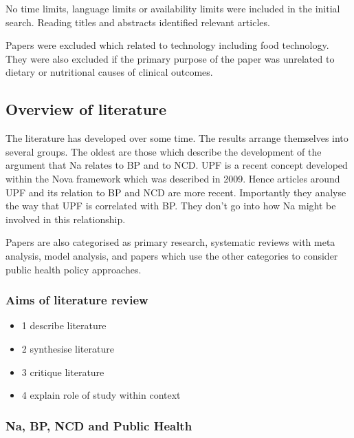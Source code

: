 \documentclass[
]{article}
\providecommand{\tightlist}{%
  \setlength{\itemsep}{0pt}\setlength{\parskip}{0pt}}
\begin{document}
No time limits, language limits or availability limits were included in
the initial search. Reading titles and abstracts identified relevant
articles.

Papers were excluded which related to technology including food
technology. They were also excluded if the primary purpose of the paper
was unrelated to dietary or nutritional causes of clinical outcomes.

\hypertarget{overview-of-literature}{%
\subsection{Overview of literature}\label{overview-of-literature}}

The literature has developed over some time. The results arrange
themselves into several groups. The oldest are those which describe the
development of the argument that Na relates to BP and to NCD. UPF is a
recent concept developed within the Nova framework which was described
in 2009. Hence articles around UPF and its relation to BP and NCD are
more recent. Importantly they analyse the way that UPF is correlated
with BP. They don't go into how Na might be involved in this
relationship.

Papers are also categorised as primary research, systematic reviews with
meta analysis, model analysis, and papers which use the other categories
to consider public health policy approaches.

\hypertarget{aims-of-literature-review}{%
\subsubsection{Aims of literature
review}\label{aims-of-literature-review}}

\begin{itemize}
\tightlist
\item
  1 describe literature
\item
  2 synthesise literature
\item
  3 critique literature
\item
  4 explain role of study within context
\end{itemize}

\hypertarget{na-bp-ncd-and-public-health}{%
\subsubsection{Na, BP, NCD and Public
Health}\label{na-bp-ncd-and-public-health}}
\end{document}
